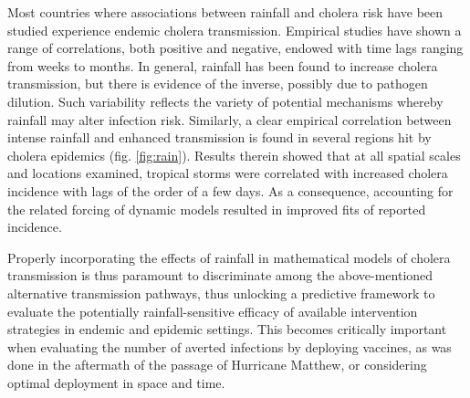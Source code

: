 Most countries where associations between rainfall and cholera risk have been studied experience endemic cholera transmission. Empirical studies have shown a range of correlations, both positive and negative, endowed with time lags ranging from weeks to months. In general, rainfall has been found to increase cholera transmission, but there is evidence of the inverse, possibly due to pathogen dilution. Such variability reflects the variety of potential mechanisms whereby rainfall may alter infection risk. Similarly, a clear empirical correlation between intense rainfall and enhanced transmission is found in several regions hit by cholera epidemics (fig. \ref{fig:rain}). Results therein showed that at all spatial scales and locations examined, tropical storms were correlated with increased cholera incidence with lags of the order of a few days. As a consequence, accounting for the related forcing of dynamic models resulted in improved fits of reported incidence. 

Properly incorporating the effects of rainfall in mathematical models of cholera transmission is thus paramount to discriminate among the above-mentioned alternative transmission pathways, thus unlocking a predictive framework to evaluate the potentially rainfall-sensitive efficacy of available intervention strategies in endemic and epidemic settings. This becomes  critically important when evaluating the number of averted infections by deploying vaccines, as was done in the aftermath of the passage of Hurricane Matthew, or considering optimal deployment in space and time.

